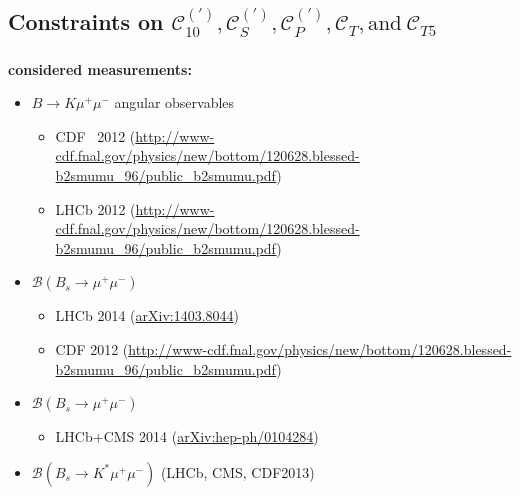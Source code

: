 \documentclass[english]{beamer}
\newcommand{\slide}[2][t]{\begin{frame}[#1] \frametitle{\insertsection} #2 \end{frame}}
\begin{document}
\subsection{Constraints on $\mathcal{C}_{10} ^{(\prime)} , \mathcal{C}_S ^{(\prime)} , \mathcal{C}_P ^{(\prime)} , \mathcal{C}_T , \text{and} ~ \mathcal{C}_{T5}$ }

\slide[c]{ %

    \frametitle{\insertsubsectionhead}

    {\large\textbf{considered measurements:}}



    \begin{itemize} %
        \item $B\rightarrow K\mu^+\mu^-$ angular observables
        \begin{itemize}
            \item CDF~ 2012 ({\url{http://www-cdf.fnal.gov/physics/new/bottom/120628.blessed-b2smumu_96/public_b2smumu.pdf}})
            \item LHCb 2012 ({\url{http://www-cdf.fnal.gov/physics/new/bottom/120628.blessed-b2smumu_96/public_b2smumu.pdf}})
        \end{itemize}
        \item $\mathcal{B}(B_s\rightarrow\mu^+\mu^-)$
        \begin{itemize}
            \item LHCb 2014 ({\href{http://arXiv.org/abs/1403.8044}{arXiv:1403.8044}})
            \item CDF 2012 ({\url{http://www-cdf.fnal.gov/physics/new/bottom/120628.blessed-b2smumu_96/public_b2smumu.pdf}})
        \end{itemize}
        \item $\mathcal{B}(B_s\rightarrow\mu^+\mu^-)$
        \begin{itemize}
            \item LHCb+CMS 2014 ({\href{http://arXiv.org/abs/hep-ph/0104284}{arXiv:hep-ph/0104284}})
        \end{itemize}
        \item $\mathcal{B}(B_s\rightarrow K^\ast\mu^+\mu^-)$ (LHCb, CMS, CDF2013)
    \end{itemize}

}
\end{document}
